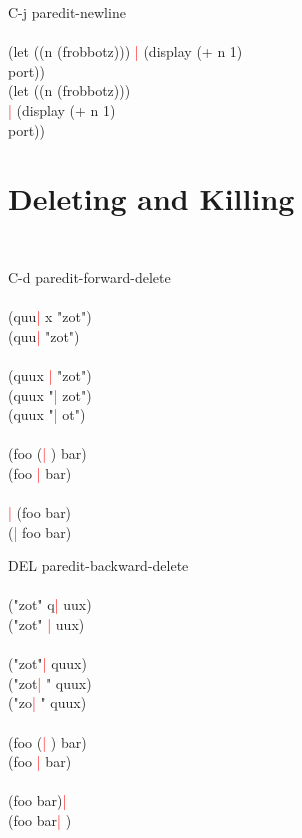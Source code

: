 \documentclass[8pt,a4paper,landscape]{extarticle}
\newcommand{\csr}{\textcolor{red}{| }}
\begin{document}
\begin{multicols}{4}
\begin{eqlist}
\item[C-j] paredit-newline\\
  \\
  (let ((n (frobbotz))) \csr (display (+ n 1)\\
  port))\\
  (let ((n (frobbotz)))\\
  \csr (display (+ n 1)\\
  port))\\
\end{eqlist}

\section{Deleting and Killing}
\begin{eqlist}
  \tt
\item[C-d] paredit-forward-delete\\
  \\
  (quu\csr x "zot")\\
  (quu\csr  "zot")\\
  \\
  (quux \csr "zot")\\
  (quux "\csr zot")\\
  (quux "\csr ot")\\
  \\
  (foo (\csr ) bar)\\
  (foo \csr  bar)\\
  \\
  \csr (foo bar)\\
  (\csr foo bar)\\


\item[DEL] paredit-backward-delete\\
  \\
  ("zot" q\csr uux)\\
  ("zot" \csr uux)\\
  \\
  ("zot"\csr  quux)\\
  ("zot\csr " quux)\\
  ("zo\csr " quux)\\
  \\
  (foo (\csr ) bar)\\
  (foo \csr  bar)\\
  \\
  (foo bar)\csr \\
  (foo bar\csr )\\



\end{eqlist}
\end{multicols}
\end{document}
